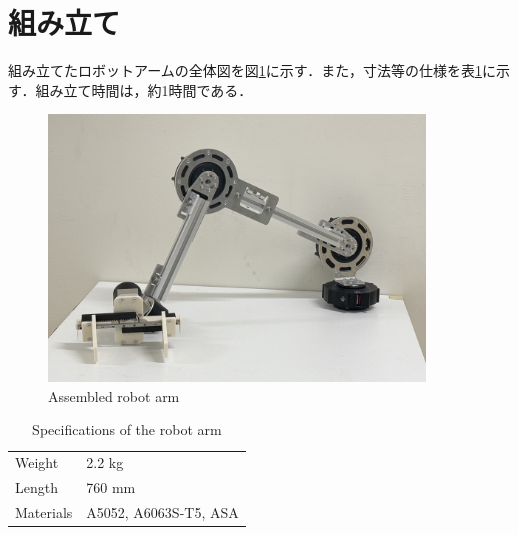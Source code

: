 \section{組み立て}
組み立てたロボットアームの全体図を図\ref{fig:arm}に示す．また，寸法等の仕様を表\ref{tab:arm}に示す．組み立て時間は，約1時間である．
\begin{figure}[h]
  \centering
  \includegraphics[width=10cm]{images/product/arm.jpg}
  \caption{Assembled robot arm}
  \label{fig:arm}
\end{figure}
\begin{table}[h]
  \centering
  \caption{Specifications of the robot arm}
  \begin{tabular}{l|l}
  \hline
  Weight    & 2.2 kg                \\
  Length    & 760 mm                \\
  Materials & A5052, A6063S-T5, ASA \\ \hline
  \end{tabular}
  \label{tab:arm}
\end{table}

\newpage